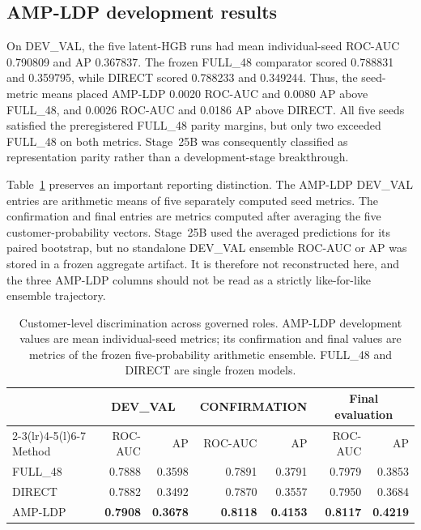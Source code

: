 \subsection{AMP-LDP development results}

On DEV\_VAL, the five latent-HGB runs had mean individual-seed ROC-AUC 0.790809 and AP 0.367837. The frozen FULL\_48 comparator scored 0.788831 and 0.359795, while DIRECT scored 0.788233 and 0.349244. Thus, the seed-metric means placed AMP-LDP 0.0020 ROC-AUC and 0.0080 AP above FULL\_48, and 0.0026 ROC-AUC and 0.0186 AP above DIRECT. All five seeds satisfied the preregistered FULL\_48 parity margins, but only two exceeded FULL\_48 on both metrics. Stage~25B was consequently classified as representation parity rather than a development-stage breakthrough.

Table~\ref{tab:governed-cohort-results} preserves an important reporting distinction. The AMP-LDP DEV\_VAL entries are arithmetic means of five separately computed seed metrics. The confirmation and final entries are metrics computed after averaging the five customer-probability vectors. Stage~25B used the averaged predictions for its paired bootstrap, but no standalone DEV\_VAL ensemble ROC-AUC or AP was stored in a frozen aggregate artifact. It is therefore not reconstructed here, and the three AMP-LDP columns should not be read as a strictly like-for-like ensemble trajectory.

\begin{table}[t]
\caption{Customer-level discrimination across governed roles. AMP-LDP development values are mean individual-seed metrics; its confirmation and final values are metrics of the frozen five-probability arithmetic ensemble. FULL\_48 and DIRECT are single frozen models.}
\label{tab:governed-cohort-results}
\centering
\small
\begin{tabular}{@{}lrrrrrr@{}}
\toprule
& \multicolumn{2}{c}{DEV\_VAL} & \multicolumn{2}{c}{CONFIRMATION} & \multicolumn{2}{c}{Final evaluation} \\
\cmidrule(lr){2-3}\cmidrule(lr){4-5}\cmidrule(l){6-7}
Method & ROC-AUC & AP & ROC-AUC & AP & ROC-AUC & AP \\
\midrule
FULL\_48 & 0.7888 & 0.3598 & 0.7891 & 0.3791 & 0.7979 & 0.3853 \\
DIRECT & 0.7882 & 0.3492 & 0.7870 & 0.3557 & 0.7950 & 0.3684 \\
AMP-LDP & \textbf{0.7908} & \textbf{0.3678} & \textbf{0.8118} & \textbf{0.4153} & \textbf{0.8117} & \textbf{0.4219} \\
\bottomrule
\end{tabular}
\end{table}

